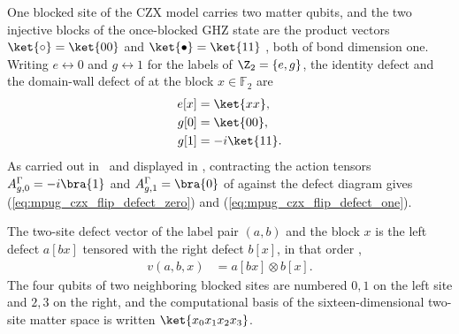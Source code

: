 \begin{definition}
    \label{def:mpug_czx_site_defects}
    \leanok
    One blocked site of the CZX model carries two matter qubits, and the two
    injective blocks of the once-blocked GHZ state are the product vectors
    $\ket{\circ}=\ket{00}$ and $\ket{\bullet}=\ket{11}$
    \cite[lines~4660--4670]{FrancoRubio2025MPUGauging}, both of bond dimension
    one. Writing $e\leftrightarrow0$ and $g\leftrightarrow1$ for the labels of
    $\Z_2=\{e,g\}$, the identity defect and the domain-wall defect of
    \cite[lines~2831--2845]{FrancoRubio2025MPUGauging} at the block
    $x\in\mathbb F_2$ are
    \begin{align}
        e[x] & =\ket{xx},   \label{eq:mpug_czx_identity_defect}  \\
        g[0] & =\ket{00},   \label{eq:mpug_czx_flip_defect_zero} \\
        g[1] & =-i\ket{11}. \label{eq:mpug_czx_flip_defect_one}
    \end{align}
    As carried out in~\cite{gap:fbc25_czx_defect_domains} and displayed
    in \cite[lines~4800--4859]{FrancoRubio2025MPUGauging}, contracting the
    action tensors $A^{\Gamma}_{g,0}=-i\bra{1}$ and
    $A^{\Gamma}_{g,1}=\bra{0}$ of
    \cite[lines~4690--4694]{FrancoRubio2025MPUGauging} against the defect
    diagram gives (\ref{eq:mpug_czx_flip_defect_zero}) and
    (\ref{eq:mpug_czx_flip_defect_one}).
\end{definition}

\begin{definition}
    \label{def:mpug_czx_defect_vectors}
    \leanok
    The two-site defect vector of the label pair $(a,b)$ and the block $x$ is
    the left defect $a[bx]$ tensored with the right defect $b[x]$, in that
    order \cite[lines~4234--4245]{FrancoRubio2025MPUGauging},
    \begin{align}
        v(a,b,x) & =a[bx]\otimes b[x].
        \label{eq:mpug_czx_defect_vector}
    \end{align}
    The four qubits of two neighboring blocked sites are numbered $0,1$ on the
    left site and $2,3$ on the right, and the computational basis of the
    sixteen-dimensional two-site matter space is written $\ket{x_0x_1x_2x_3}$.
\end{definition}

